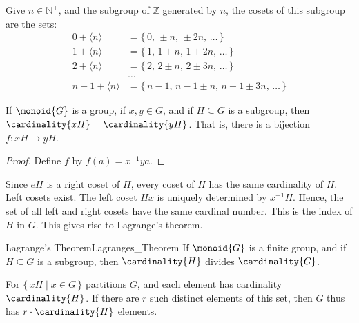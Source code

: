             \begin{example}
                Give $n\in\mathbb{N}^{+}$, and the subgroup of $\mathbb{Z}$
                generated by $n$, the cosets of this subgroup are the
                sets:
                \begin{subequations}
                    \begin{align}
                        0+\langle{n}\rangle
                            &=\{\,0,\,\pm{n},\,\pm{2}n,\,\dots\,\}\\
                        1+\langle{n}\rangle
                            &=\{\,1,\,1\pm{n},\,1\pm{2}n,\,\dots\,\}\\
                        2+\langle{n}\rangle
                            &=\{\,2,\,2\pm{n},\,2\pm{3}n,\,\dots\,\}\\
                        &\hdots\\
                        n-1+\langle{n}\rangle
                        &=\{\,n-1,\,n-1\pm{n},\,n-1\pm{3}n,\,\dots\,\}
                    \end{align}
                \end{subequations}
            \end{example}
            \begin{theorem}
                If $\monoid{G}$ is a group, if $x,y\in{G}$, and if
                $H\subseteq{G}$ is a subgroup, then
                $\cardinality{xH}=\cardinality{yH}$. That is, there is a
                bijection $f:xH\rightarrow{y}H$.
            \end{theorem}
            \begin{proof}
                Define $f$ by $f(a)=x^{\minus{1}}ya$.
            \end{proof}
            Since $eH$ is a right coset of $H$, every coset of $H$ has the
            same cardinality of $H$. Left cosets exist. The left coset
            $Hx$ is uniquely determined by $x^{\minus{1}}H$. Hence, the set
            of all left and right cosets have the same cardinal number. This
            is the index of $H$ in $G$. This gives rise to Lagrange's
            theorem.
            \begin{ftheorem}{Lagrange's Theorem}{Lagranges_Theorem}
                If $\monoid{G}$ is a finite group, and if $H\subseteq{G}$
                is a subgroup, then $\cardinality{H}$ divides
                $\cardinality{G}$.
            \end{ftheorem}
            \begin{bproof}
                For $\{\,xH\;|\;x\in{G}\,\}$ partitions $G$, and each
                element has cardinality $\cardinality{H}$. If there are $r$
                such distinct elements of this set, then $G$ thus has
                $r\cdot\cardinality{H}$ elements.
            \end{bproof}
